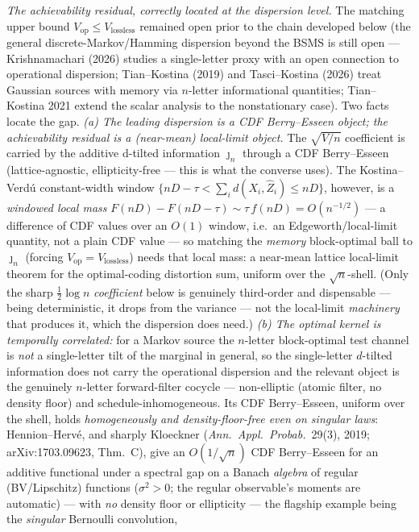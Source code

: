 \documentclass[
]{article}
\begin{document}
\emph{The achievability residual, correctly located at the dispersion level.} The
matching upper bound $V_{\mathrm{op}}\le V_{\mathrm{lossless}}$ remained open prior to the chain
developed below (the general discrete-Markov/Hamming dispersion beyond the BSMS is still open ---
Krishnamachari (2026) studies a single-letter proxy with an open connection
to operational dispersion; Tian--Kostina (2019) and Tasci--Kostina (2026) treat
Gaussian sources with memory via $n$-letter informational quantities; Tian--Kostina
2021 extend the scalar analysis to the nonstationary case). Two facts locate the gap. \emph{(a)
The leading dispersion is a CDF Berry--Esseen object; the achievability residual is a (near-mean)
local-limit object.} The $\sqrt{V/n}$ coefficient is carried by the additive d-tilted information
$\jmath_n$ through a CDF Berry--Esseen (lattice-agnostic, ellipticity-free --- this is what the converse
uses). The Kostina--Verd\'u constant-width window $\{nD-\tau<\sum_i d(X_i,\hat Z_i)\le nD\}$, however, is
a \emph{windowed local mass} $F(nD)-F(nD-\tau)\sim\tau\,f(nD)=O(n^{-1/2})$ --- a difference of CDF values
over an $O(1)$ window, i.e.\ an Edgeworth/local-limit quantity, not a plain CDF value --- so matching the
\emph{memory} block-optimal ball to $\jmath_n$ (forcing $V_{\mathrm{op}}=V_{\mathrm{lossless}}$) needs
that local mass: a near-mean lattice local-limit theorem for the optimal-coding distortion sum, uniform
over the $\sqrt n$-shell. (Only the sharp $\tfrac12\log n$ \emph{coefficient} below is genuinely
third-order and dispensable --- being deterministic, it drops from the variance --- not the local-limit
\emph{machinery} that produces it, which the dispersion does need.) \emph{(b) The optimal kernel is temporally correlated:} for a Markov source
the $n$-letter block-optimal test channel is \emph{not} a single-letter tilt of the marginal
in general, so the single-letter $d$-tilted information does not carry the operational
dispersion and the relevant object is the genuinely $n$-letter forward-filter cocycle --- non-elliptic
(atomic filter, no density floor) and schedule-inhomogeneous. Its CDF Berry--Esseen, uniform over the
shell, holds \emph{homogeneously and density-floor-free even on singular laws}: Hennion--Herv\'e, and
sharply Kloeckner (\emph{Ann.\ Appl.\ Probab.}\ 29(3), 2019; arXiv:1703.09623, Thm.~C), give an
$O(1/\sqrt n)$ CDF Berry--Esseen for an additive functional under a spectral gap on a Banach
\emph{algebra} of regular (BV/Lipschitz) functions ($\sigma^2>0$; the regular observable's moments are
automatic) --- with \emph{no} density floor or ellipticity --- the flagship example being the \emph{singular} Bernoulli convolution,
\end{document}
